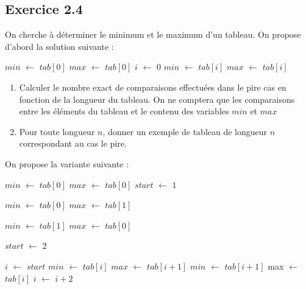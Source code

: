 \documentclass{article}[12pt]
\newcommand*\Let[2]{\State #1 $\gets$ #2}
\begin{document}
\subsection*{Exercice 2.4}
On cherche à déterminer le minimum et le maximum d'un tableau. On propose d'abord la solution suivante :
\begin{tcolorbox}
  \begin{algorithmic}[1]
      \Let{$min$}{$tab[0]$}
      \Let{$max$}{$tab[0]$}
      \Let{$i$}{$0$}
          \Let{$min$}{$tab[i]$}
         \Else{}
          \Let{$max$}{$tab[i]$}
        \EndIf
        \EndIf
      \EndFor
  \EndFunction
  \end{algorithmic}
\end{tcolorbox}

\begin{enumerate}
    \item Calculer le nombre exact de comparaisons effectuées dans le pire cas en fonction de la longueur du tableau. On ne comptera que les comparaisons entre les éléments du tableau et le contenu des variables $min$ et $max$
    \item Pour toute longueur $n$, donner un exemple de tableau de longueur $n$ correspondant au cas le pire.
\end{enumerate}


On propose la variante suivante :
\begin{tcolorbox}
  \begin{algorithmic}[1]
          \Let{$min$}{$tab[0]$}
          \Let{$max$}{$tab[0]$}
          \Let{$start$}{$1$}
          
         \Else{}
         \Let{$min$}{$tab[0]$}
          \Let{$max$}{$tab[1]$}
          
          \Else
            \Let{$min$}{$tab[1]$}
          \Let{$max$}{$tab[0]$}
          \EndIf
        
        \Let{$start$}{$2$}
    \EndIf
    
    
      \Let{$i$}{$start$}
          \Let{$min$}{$tab[i]$}
            \EndIf
          \Let{$max$}{$tab[i + 1]$}
        \EndIf
        \Else
        \Let{$min$}{$tab[i + 1]$}
        \EndIf
        \Let{max}{$tab[i]$}
        \EndIf
    \EndIf
      \Let{$i$}{$i + 2$}
      \EndFor
  \EndFunction
  \end{algorithmic}
\end{tcolorbox}
\end{document}
